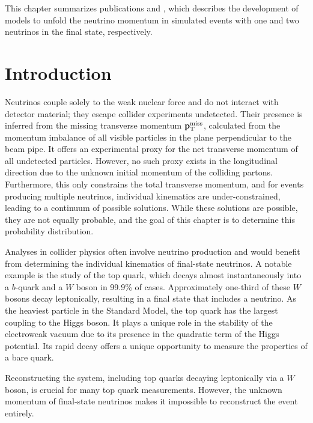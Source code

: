 This chapter summarizes publications \textcite{NuFlows1} and \textcite{Nu2Flows}, which describes the development of models to unfold the neutrino momentum in simulated \ttbar events with one and two neutrinos in the final state, respectively.

\section{Introduction}

Neutrinos couple solely to the weak nuclear force and do not interact with detector material; they escape collider experiments undetected.
Their presence is inferred from the missing transverse momentum $\mathbf{p}_\mathrm{T}^{\mathrm{miss}}$, calculated from the momentum imbalance of all visible particles in the plane perpendicular to the beam pipe.
It offers an experimental proxy for the net transverse momentum of all undetected particles.
However, no such proxy exists in the longitudinal direction due to the unknown initial momentum of the colliding partons.
Furthermore, this only constrains the total transverse momentum, and for events producing multiple neutrinos, individual kinematics are under-constrained, leading to a continuum of possible solutions.
While these solutions are possible, they are not equally probable, and the goal of this chapter is to determine this probability distribution.

Analyses in collider physics often involve neutrino production and would benefit from determining the individual kinematics of final-state neutrinos.
A notable example is the study of the top quark, which decays almost instantaneously into a $b$-quark and a $W$ boson in 99.9\% of cases.
Approximately one-third of these $W$ bosons decay leptonically, resulting in a final state that includes a neutrino.
As the heaviest particle in the Standard Model, the top quark has the largest coupling to the Higgs boson.
It plays a unique role in the stability of the electroweak vacuum due to its presence in the quadratic term of the Higgs potential.
Its rapid decay offers a unique opportunity to measure the properties of a bare quark.

Reconstructing the \ttbar system, including top quarks decaying leptonically via a $W$ boson, is crucial for many top quark measurements.
However, the unknown momentum of final-state neutrinos makes it impossible to reconstruct the event entirely.

